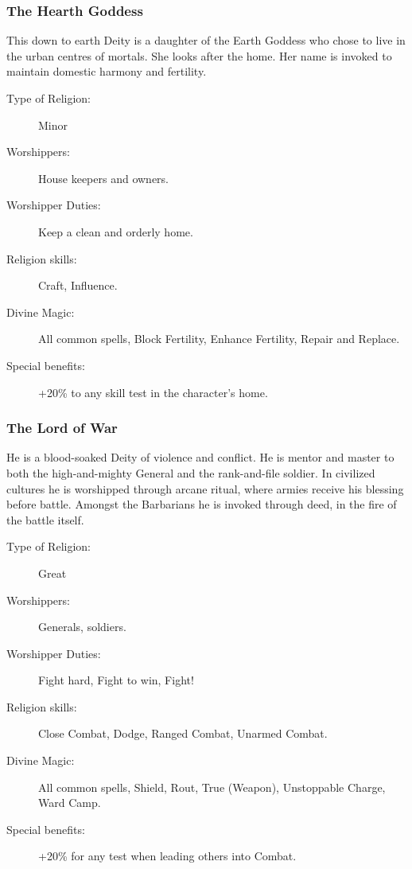 \subsubsection{The Hearth Goddess}
This down to earth Deity is a daughter of the Earth Goddess who chose to live in the urban centres of mortals. She looks after the home. Her name is invoked to maintain domestic harmony and fertility.

\begin{description}
\item[Type of Religion:] Minor
\item[Worshippers:] House keepers and owners.
\item[Worshipper Duties:] Keep a clean and orderly home.
\item[Religion skills:] Craft, Influence.
\item[Divine Magic:] All common spells, Block Fertility, Enhance Fertility, Repair and Replace.
\item[Special benefits:] +20\% to any skill test in the character’s home.
\end{description}


\subsubsection{The Lord of War}
He is a blood-soaked Deity of violence and conflict. He is mentor and master to both the high-and-mighty General and the rank-and-file soldier. In civilized cultures he is worshipped through arcane ritual, where armies receive his blessing before battle. Amongst the Barbarians he is invoked through deed, in the fire of the battle itself.

\begin{description}
\item[Type of Religion:] Great
\item[Worshippers:] Generals, soldiers.
\item[Worshipper Duties:] Fight hard, Fight to win, Fight!
\item[Religion skills:] Close Combat, Dodge, Ranged Combat, Unarmed Combat.
\item[Divine Magic:] All common spells, Shield, Rout, True (Weapon), Unstoppable Charge, Ward Camp.
\item[Special benefits:] +20\% for any test when leading others into Combat.
\end{description}


